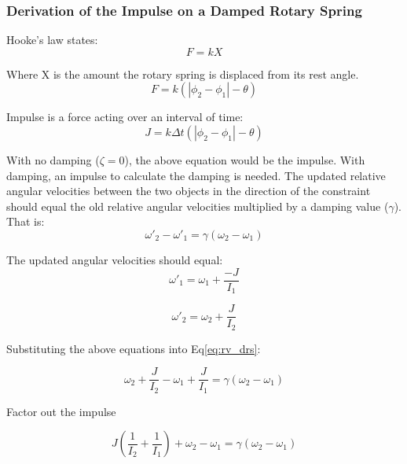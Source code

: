 \documentclass[12pt]{article}
\begin{document}
\subsubsection{Derivation of the Impulse on a Damped Rotary Spring}
Hooke's law states:
\begin{equation*}
 F = k X
\end{equation*}

\noindent
Where X is the amount the rotary spring is displaced from its rest angle. 
\begin{equation*}
 F = k(| \phi_\text{2} -  \phi_\text{1}| - \theta)
\end{equation*}

\noindent
Impulse is a force acting over an interval of time: 
\begin{equation}
 J = k\Delta t(| \phi_\text{2} - \phi_\text{1}| - \theta) \label{eq:hooke2}
\end{equation}

\noindent
With no damping ($\zeta=0$), the above equation would be the impulse. 
With damping, an impulse to calculate the damping is needed.
The updated relative angular velocities 
between the two objects in the direction of the constraint should 
equal the old relative angular velocities multiplied by a damping value
($\gamma$).
That is:
\begin{equation}
\omega'_\text{2} -  \omega'_\text{1}=
\gamma(\omega_\text{2} -  \omega_\text{1}) \label{eq:rv_drs}
\end{equation}

\noindent
The updated angular velocities should equal:
\begin{equation*}
  \omega'_\text{1} =   \omega_\text{1} + \frac{-J}{I_\text{1}}
  \end{equation*}
  
\begin{equation*}
   \omega'_\text{2}  =  \omega_\text{2} +   \frac{J}{I_\text{2}}
  \end{equation*}

\noindent
Substituting the above equations into Eq\ref{eq:rv_drs}:

\begin{equation*}
\omega_\text{2} + \frac{J}{I_\text{2}} - \omega_\text{1} + \frac{J}{I_\text{1}}=
\gamma( \omega_\text{2}  -    \omega_\text{1})
\end{equation*}

\noindent
Factor out the impulse

\begin{equation*}
J(\frac{1}{I_\text{2}} + \frac{1}{I_\text{1}} ) + \omega_\text{2} -
\omega_\text{1}=
 \gamma( \omega_\text{2}  -    \omega_\text{1})
\end{equation*}
\end{document}
